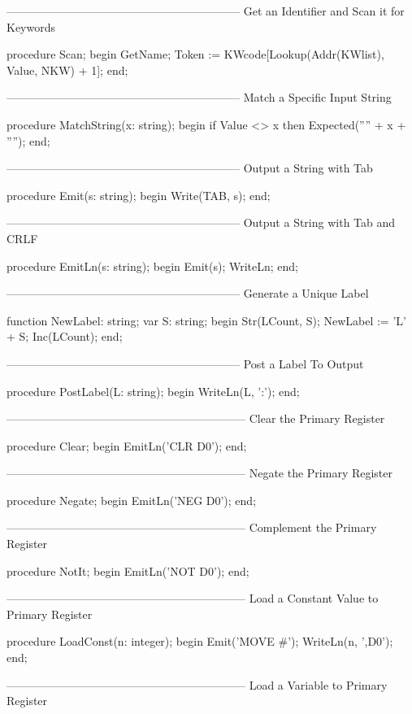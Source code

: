 \documentclass[float=false, crop=false]{standalone}
\begin{document}
\begin{code}
{--------------------------------------------------------------}
{ Get an Identifier and Scan it for Keywords }

procedure Scan;
begin
   GetName;
   Token := KWcode[Lookup(Addr(KWlist), Value, NKW) + 1];
end;


{--------------------------------------------------------------}
{ Match a Specific Input String }

procedure MatchString(x: string);
begin
   if Value <> x then Expected('''' + x + '''');
end;


{--------------------------------------------------------------}
{ Output a String with Tab }

procedure Emit(s: string);
begin
   Write(TAB, s);
end;


{--------------------------------------------------------------}
{ Output a String with Tab and CRLF }

procedure EmitLn(s: string);
begin
   Emit(s);
   WriteLn;
end;


{--------------------------------------------------------------}
{ Generate a Unique Label }

function NewLabel: string;
var S: string;
begin
   Str(LCount, S);
   NewLabel := 'L' + S;
   Inc(LCount);
end;


{--------------------------------------------------------------}
{ Post a Label To Output }

procedure PostLabel(L: string);
begin
   WriteLn(L, ':');
end;


{---------------------------------------------------------------}
{ Clear the Primary Register }

procedure Clear;
begin
   EmitLn('CLR D0');
end;


{---------------------------------------------------------------}
{ Negate the Primary Register }

procedure Negate;
begin
   EmitLn('NEG D0');
end;


{---------------------------------------------------------------}
{ Complement the Primary Register }

procedure NotIt;
begin
   EmitLn('NOT D0');
end;


{---------------------------------------------------------------}
{ Load a Constant Value to Primary Register }

procedure LoadConst(n: integer);
begin
   Emit('MOVE #');
   WriteLn(n, ',D0');
end;


{---------------------------------------------------------------}
{ Load a Variable to Primary Register }


\end{code}
\end{document}
